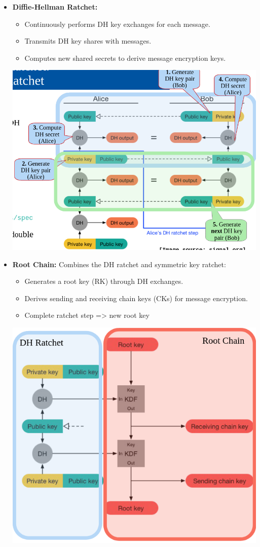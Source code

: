 \begin{itemize}
    \item \textbf{Diffie-Hellman Ratchet:}
    \begin{itemize}
        \item Continuously performs DH key exchanges for each message.
        \item Transmits DH key shares with messages.
        \item Computes new shared secrets to derive message encryption keys.
    \end{itemize}
    \includegraphics[width=0.8\columnwidth]{Resources/signal_dh.png}
    
    \item \textbf{Root Chain:} Combines the DH ratchet and symmetric key ratchet:
    \begin{itemize}
        \item Generates a root key (RK) through DH exchanges.
        \item Derives sending and receiving chain keys (CKs) for message encryption.
        \item Complete ratchet step => new root key
    \end{itemize}
    \includegraphics[width=.5\columnwidth]{Resources/signal_root_chain.png}
    

\end{itemize}
